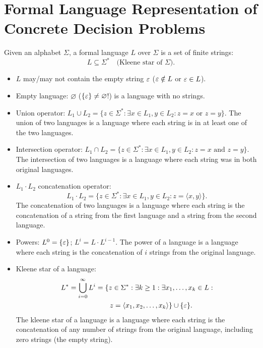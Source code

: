 \section{Formal Language Representation of Concrete Decision Problems}

\begin{notesdefinition}
Given an alphabet $\Sigma$, a formal language $L$ over $\Sigma$ is a set of finite strings:
\[
L\subseteq\Sigma^*\quad\text{(Kleene star of }\Sigma\text{)}.
\]
\end{notesdefinition}

\begin{itemize}
\item $L$ may/may not contain the empty string $\varepsilon$ ($\varepsilon\notin L$ or $\varepsilon\in L$).
\item Empty language: $\varnothing$ ($\{\varepsilon\}\neq\varnothing$!) is a language with no strings.
\item Union operator: $L_1\cup L_2=\{z\in\Sigma^*:\exists x\in L_1,y\in L_2:z=x\text{ or }z=y\}$. The union of two languages is a language where each string is in at least one of the two languages.
\item Intersection operator: $L_1\cap L_2=\{z\in\Sigma^*:\exists x\in L_1,y\in L_2:z=x\text{ and }z=y\}$. The intersection of two languages is a language where each string was in both original languages.
\item $L_1\cdot L_2$ concatenation operator:
\[
L_1\cdot L_2=\{z\in\Sigma^*:\exists x\in L_1,y\in L_2:z=\langle x,y\rangle\}.
\]
The concatenation of two languages is a language where each string is the concatenation of a string from the first language and a string from the second language.
\item Powers: $L^0=\{\varepsilon\}$; $L^i=L\cdot L^{i-1}$. The power of a language is a language where each string is the concatenation of $i$ strings from the original language. 
\item Kleene star of a language:
\[
\begin{split}
L^*=\bigcup_{i=0}^\infty L^i
&=\{z\in\Sigma^*:\exists k\geq1:\exists x_1,\ldots,x_k\in L:\\
&\qquad z=\langle x_1,x_2,\ldots,x_k\rangle\}\cup\{\varepsilon\}.
\end{split}
\] The kleene star of a language is a language where each string is the concatenation of any number of strings from the original language, including zero strings (the empty string).
\end{itemize}
